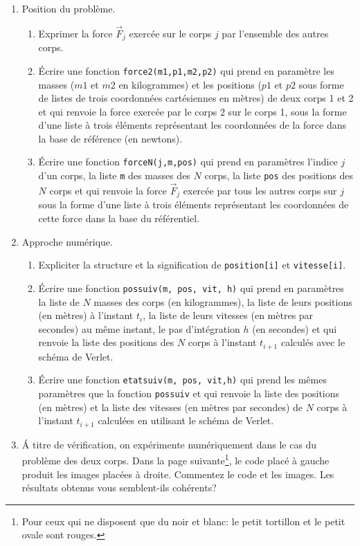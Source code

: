 \begin{enumerate}
  \item Position du problème.
\begin{enumerate}
  \item Exprimer la force $\overrightarrow{F}_j$ exercée sur le corps $j$ par l'ensemble des autres corps.
  \item \'Ecrire une fonction \texttt{force2(m1,p1,m2,p2)} qui prend en paramètre les masses ($m1$ et $m2$ en kilogrammes) et les positions ($p1$ et $p2$ sous forme de listes de trois coordonnées cartésiennes en mètres) de deux corps 1 et 2 et qui renvoie la force exercée par le corps 2 sur le corps 1, sous la forme d'une liste à trois éléments représentant les coordonnées de la force dans la base de référence (en newtons).
  \item \'Ecrire une fonction \texttt{forceN(j,m,pos)} qui prend en paramètres l'indice $j$ d'un corps, la liste \texttt{m} des masses des $N$ corps, la liste \texttt{pos} des positions des $N$ corps et qui renvoie la force $\overrightarrow{F}_j$ exercée par tous les autres corps sur $j$ sous la forme d'une liste à trois éléments représentant les coordonnées de cette force dans la base du référentiel.
\end{enumerate}

\item Approche numérique.
\begin{enumerate}
  \item Expliciter la structure et la signification de \texttt{position[i]} et \texttt{vitesse[i]}.
  \item \'Ecrire une fonction \texttt{pos\textunderscore suiv(m, pos, vit, h)} qui prend en paramètres la liste de $N$ masses des corps (en kilogrammes), la liste de leurs positions (en mètres) à l'instant $t_i$, la liste de leurs vitesses (en mètres par secondes) au même instant, le pas d'intégration $h$ (en secondes) et qui renvoie la liste des positions des $N$ corps à l'instant $t_{i+1}$ calculés avec le schéma de Verlet.
  \item \'Ecrire une fonction \texttt{etat\textunderscore suiv(m, pos, vit,h)} qui prend les mêmes paramètres que la fonction \texttt{pos\textunderscore suiv} et qui renvoie la liste des positions (en mètres) et la liste des vitesses (en mètres par secondes) de $N$ corps à l'instant $t_{i+1}$ calculées en utilisant le schéma de Verlet. 
\end{enumerate}
  \item \'A titre de vérification, on expérimente numériquement dans le cas du problème des deux corps. Dans la page suivante\footnote{Pour ceux qui ne disposent que du noir et blanc: le petit tortillon et le petit ovale sont rouges.}, le code placé à gauche produit les images placées à droite. Commentez le code et les images. Les résultats obtenus vous semblent-ils cohérents?
\end{enumerate}
